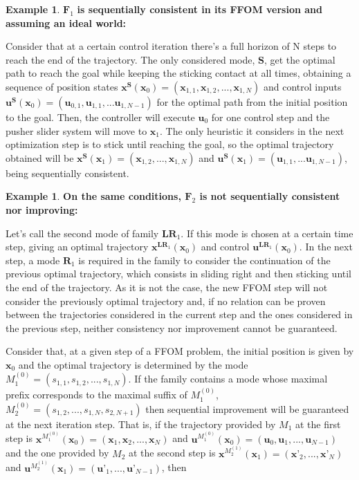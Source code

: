 \documentclass[12,twoside]{TFG-GM}
\theoremstyle{definition}
\newtheorem{example}[theorem]{Example}
\theoremstyle{remark}
\begin{document}
\begin{example} \label{ex:f1consistent} $\textbf{F}_1$ \textbf{is sequentially consistent in its FFOM version and assuming an ideal world:}

Consider that at a certain control iteration there's a full horizon of N steps to reach the end of the trajectory. The only considered mode, $\textbf{S}$, get the optimal path to reach the goal while keeping the sticking contact at all times, obtaining a sequence of position states $\textbf{x}^{\textbf{S}}(\textbf{x}_0) = (\textbf{x}_{1,1}, \textbf{x}_{1,2}, ..., \textbf{x}_{1,N})$ and control inputs $\textbf{u}^{\textbf{S}}(\textbf{x}_0) = (\textbf{u}_{0,1}, \textbf{u}_{1,1}, ... \textbf{u}_{1,N-1})$ for the optimal path from the initial position to the goal. Then, the controller will execute $\textbf{u}_0$ for one control step and the pusher slider system will move to $\textbf{x}_1$. The only heuristic it considers in the next optimization step is to stick until reaching the goal, so the optimal trajectory obtained will be $\textbf{x}^{\textbf{S}}(\textbf{x}_1) = (\textbf{x}_{1,2}, ..., \textbf{x}_{1,N})$ and $\textbf{u}^{\textbf{S}}(\textbf{x}_1) = (\textbf{u}_{1,1}, ... \textbf{u}_{1,N-1})$, being sequentially consistent.
\end{example}
\begin{example} \label{ex:f2notconsistent} \textbf{On the same conditions, $\textbf{F}_2$ is not sequentially consistent nor improving:}

Let's call the second mode of family $\textbf{LR}_1$. If this mode is chosen at a certain time step, giving an optimal trajectory $\textbf{x}^{\textbf{LR}_1}(\textbf{x}_0)$ and control $\textbf{u}^{\textbf{LR}_1}(\textbf{x}_0)$. In the next step, a mode $\textbf{R}_1$ is required in the family to consider the continuation of the previous optimal trajectory, which consists in sliding right and then sticking until the end of the trajectory. As it is not the case, the new FFOM step will not consider the previously optimal trajectory and, if no relation can be proven between the trajectories considered in the current step and the ones considered in the previous step, neither consistency nor improvement cannot be guaranteed.
\end{example}


Consider that, at a given step of a FFOM problem, the initial position is given by $\textbf{x}_0$ and the optimal trajectory is determined by the mode $M_1^{(0)} = (s_{1,1}, s_{1,2}, ..., s_{1,N})$. If the family contains a mode whose maximal prefix corresponds to the maximal suffix of $M_1^{(0)}$, $M_2^{(0)} = (s_{1,2}, ..., s_{1,N}, s_{2,N+1} )$ then sequential improvement will be guaranteed at the next iteration step. That is, if the trajectory provided by $M_1$ at the first step is $\textbf{x}^{M_1^{(0)}}(\textbf{x}_0) = (\textbf{x}_1, \textbf{x}_2, ..., \textbf{x}_N)$ and $\textbf{u}^{M_1^{(0)}}(\textbf{x}_0) = (\textbf{u}_0, \textbf{u}_1, ..., \textbf{u}_{N-1})$ and the one provided by $M_2$ at the second step is $\textbf{x}^{M_2^{(1)}}(\textbf{x}_1) = (\textbf{x'}_2, ..., \textbf{x'}_N)$ and $\textbf{u}^{M_2^{(1)}}(\textbf{x}_1) = (\textbf{u'}_1, ..., \textbf{u'}_{N-1})$, then
\end{document}
